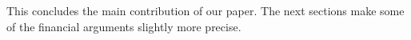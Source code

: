 This concludes the main contribution of our paper. The next
sections make some of the financial arguments slightly more precise.


%
%

